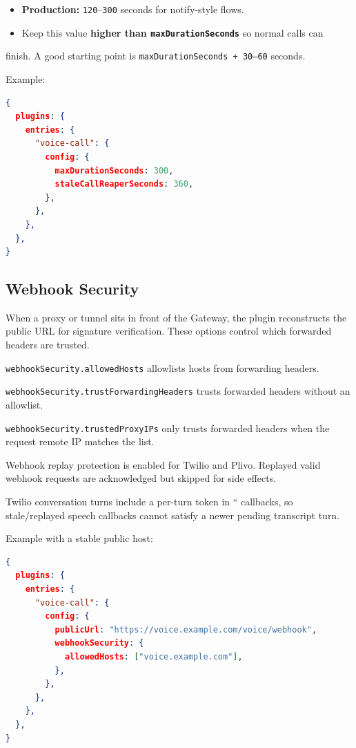 \begin{itemize}
  \item \textbf{Production:} \texttt{120}–\texttt{300} seconds for notify-style flows.
  \item Keep this value \textbf{higher than \texttt{maxDurationSeconds}} so normal calls can
\end{itemize}

finish. A good starting point is \texttt{maxDurationSeconds + 30–60} seconds.

Example:

\begin{lstlisting}[language=json]
{
  plugins: {
    entries: {
      "voice-call": {
        config: {
          maxDurationSeconds: 300,
          staleCallReaperSeconds: 360,
        },
      },
    },
  },
}
\end{lstlisting}


\subsection{Webhook Security}


When a proxy or tunnel sits in front of the Gateway, the plugin reconstructs the
public URL for signature verification. These options control which forwarded
headers are trusted.

\texttt{webhookSecurity.allowedHosts} allowlists hosts from forwarding headers.

\texttt{webhookSecurity.trustForwardingHeaders} trusts forwarded headers without an allowlist.

\texttt{webhookSecurity.trustedProxyIPs} only trusts forwarded headers when the request
remote IP matches the list.

Webhook replay protection is enabled for Twilio and Plivo. Replayed valid webhook
requests are acknowledged but skipped for side effects.

Twilio conversation turns include a per-turn token in `` callbacks, so
stale/replayed speech callbacks cannot satisfy a newer pending transcript turn.

Example with a stable public host:

\begin{lstlisting}[language=json]
{
  plugins: {
    entries: {
      "voice-call": {
        config: {
          publicUrl: "https://voice.example.com/voice/webhook",
          webhookSecurity: {
            allowedHosts: ["voice.example.com"],
          },
        },
      },
    },
  },
}
\end{lstlisting}


